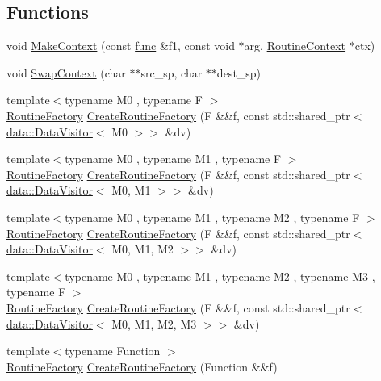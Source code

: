 \subsection*{Functions}
\begin{DoxyCompactItemize}
\item 
void \hyperlink{namespaceapollo_1_1cyber_1_1croutine_acf92a957d93bc7200c945d560827fb4f}{Make\-Context} (const \hyperlink{namespaceapollo_1_1cyber_1_1croutine_a10b1486257a9f9174f905a6f4a54523f}{func} \&f1, const void $\ast$arg, \hyperlink{structapollo_1_1cyber_1_1croutine_1_1RoutineContext}{Routine\-Context} $\ast$ctx)
\item 
void \hyperlink{namespaceapollo_1_1cyber_1_1croutine_a909857eec1b9f6f963de7dc22bf7cc92}{Swap\-Context} (char $\ast$$\ast$src\-\_\-sp, char $\ast$$\ast$dest\-\_\-sp)
\item 
{\footnotesize template$<$typename M0 , typename F $>$ }\\\hyperlink{classapollo_1_1cyber_1_1croutine_1_1RoutineFactory}{Routine\-Factory} \hyperlink{namespaceapollo_1_1cyber_1_1croutine_a10e8cae84e11868f0b7a867b3ec07409}{Create\-Routine\-Factory} (F \&\&f, const std\-::shared\-\_\-ptr$<$ \hyperlink{classapollo_1_1cyber_1_1data_1_1DataVisitor}{data\-::\-Data\-Visitor}$<$ M0 $>$$>$ \&dv)
\item 
{\footnotesize template$<$typename M0 , typename M1 , typename F $>$ }\\\hyperlink{classapollo_1_1cyber_1_1croutine_1_1RoutineFactory}{Routine\-Factory} \hyperlink{namespaceapollo_1_1cyber_1_1croutine_aa78086f3d811e17add67e3f38336afe3}{Create\-Routine\-Factory} (F \&\&f, const std\-::shared\-\_\-ptr$<$ \hyperlink{classapollo_1_1cyber_1_1data_1_1DataVisitor}{data\-::\-Data\-Visitor}$<$ M0, M1 $>$$>$ \&dv)
\item 
{\footnotesize template$<$typename M0 , typename M1 , typename M2 , typename F $>$ }\\\hyperlink{classapollo_1_1cyber_1_1croutine_1_1RoutineFactory}{Routine\-Factory} \hyperlink{namespaceapollo_1_1cyber_1_1croutine_af447a52b313ddec1d785c15fd7d045a0}{Create\-Routine\-Factory} (F \&\&f, const std\-::shared\-\_\-ptr$<$ \hyperlink{classapollo_1_1cyber_1_1data_1_1DataVisitor}{data\-::\-Data\-Visitor}$<$ M0, M1, M2 $>$$>$ \&dv)
\item 
{\footnotesize template$<$typename M0 , typename M1 , typename M2 , typename M3 , typename F $>$ }\\\hyperlink{classapollo_1_1cyber_1_1croutine_1_1RoutineFactory}{Routine\-Factory} \hyperlink{namespaceapollo_1_1cyber_1_1croutine_a77fe2103742e21e13e25f76f7193085c}{Create\-Routine\-Factory} (F \&\&f, const std\-::shared\-\_\-ptr$<$ \hyperlink{classapollo_1_1cyber_1_1data_1_1DataVisitor}{data\-::\-Data\-Visitor}$<$ M0, M1, M2, M3 $>$$>$ \&dv)
\item 
{\footnotesize template$<$typename Function $>$ }\\\hyperlink{classapollo_1_1cyber_1_1croutine_1_1RoutineFactory}{Routine\-Factory} \hyperlink{namespaceapollo_1_1cyber_1_1croutine_a86b2876965ee3da499523200781100a9}{Create\-Routine\-Factory} (Function \&\&f)
\end{DoxyCompactItemize}

